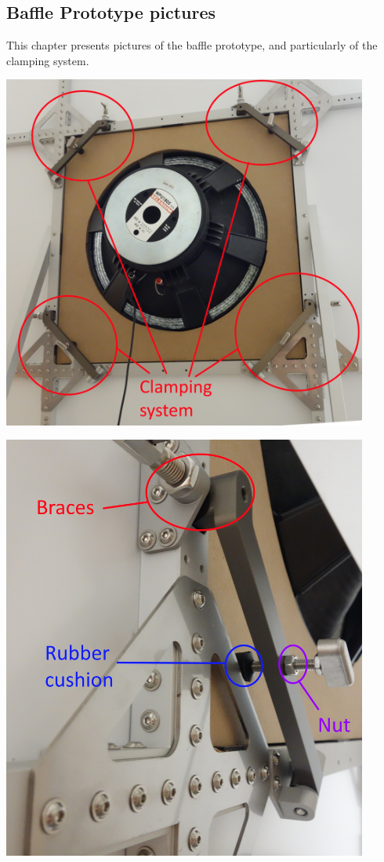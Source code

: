 \documentclass{report}
\begin{document}
\begin{appendices}
\chapter{Baffle Prototype pictures}
\label{Chap:baffle_pics}
This chapter presents pictures of the baffle prototype, and particularly of the clamping system. \\

\begin{minipage}{0.5\textwidth}
\begin{center}
	\includegraphics[width=0.9\textwidth]{Appendix/baffle_back}
    \captionsetup{hypcap=false}
    \label{fig:baffleback}
\end{center}
\begin{center}
	\includegraphics[width=0.9\textwidth]{Appendix/baffle_clamps}

\end{center}
\end{minipage}
\end{appendices}
\end{document}
